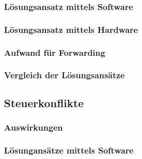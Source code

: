 \subsubsection{Lösungsansatz mittels Software}
\subsubsection{Lösungsansatz mittels Hardware}
\subsubsection*{Aufwand für Forwarding}

\subsubsection{Vergleich der Lösungsansätze}

\subsection{Steuerkonflikte}

\subsubsection{Auswirkungen}

\subsubsection{Lösungansätze mittels Software}

